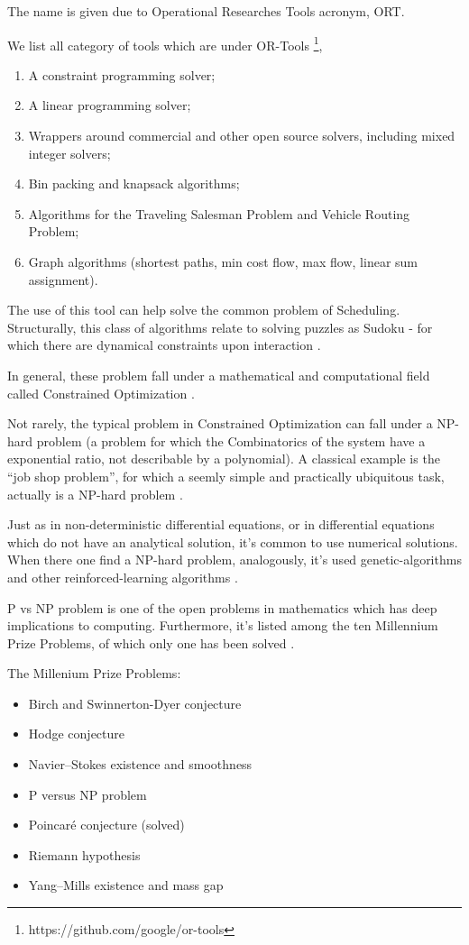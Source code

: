 \documentclass[
12pt,				%
openright,			%
oneside,			%
a4paper,			%
brazil,				%
english,			  %
]{abntex2}
\begin{document}
The name is given due to Operational Researches Tools acronym, ORT.

We list all category of tools which are under OR-Tools \footnote{https://github.com/google/or-tools},

\begin{enumerate}
\item A constraint programming solver;
\item A linear programming solver;
\item  Wrappers around commercial and other open source solvers, including mixed integer solvers;
\item  Bin packing and knapsack algorithms;
\item  Algorithms for the Traveling Salesman Problem and Vehicle Routing Problem;
\item  Graph algorithms (shortest paths, min cost flow, max flow, linear sum assignment).
\end{enumerate}


The use of this tool can help solve the common problem of
Scheduling. Structurally, this class of algorithms relate to solving
puzzles as Sudoku - for which there are dynamical constraints upon
interaction \cite{simonis2005sudoku}. 

In general, these problem fall under a mathematical and computational
field called Constrained Optimization \cite{bertsekas2014constrained}. 

Not rarely, the typical problem in Constrained Optimization can fall
under a NP-hard problem (a problem for which the Combinatorics of the
system have a exponential ratio, not describable by a polynomial). A
classical example is the ``job shop problem'', for which a seemly
simple and practically ubiquitous task, actually is a NP-hard problem \cite{zhang2019review}.   

Just as in non-deterministic differential equations, or in
differential equations which do not have an analytical solution, it's
common to use numerical solutions. When there one find a NP-hard
problem, analogously, it's used genetic-algorithms and other
reinforced-learning algorithms \cite{zhang2019review}.  

P vs NP problem is one of the open problems in mathematics which has
deep implications to computing. Furthermore, it's listed among the ten
Millennium Prize Problems, of which only one has been solved \cite{cook2006p}.

The Millenium Prize Problems:

\begin{itemize}
  \item Birch and Swinnerton-Dyer conjecture
  \item Hodge conjecture
  \item Navier–Stokes existence and smoothness
  \item P versus NP problem
  \item Poincaré conjecture (solved)
  \item Riemann hypothesis
  \item Yang–Mills existence and mass gap
\end{itemize}
\end{document}
